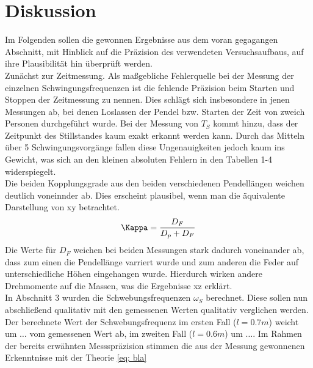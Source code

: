 \section{Diskussion}
Im Folgenden sollen die gewonnen Ergebnisse aus dem voran gegagangen Abschnitt, mit Hinblick auf die Präzision
des verwendeten Versuchsaufbaus, auf ihre Plausibilität hin überprüft werden.\\
Zunächst zur Zeitmessung. Als maßgebliche Fehlerquelle bei der Messung der einzelnen Schwingungsfrequenzen ist die
fehlende Präzision beim Starten und Stoppen der Zeitmessung zu nennen. Dies schlägt sich
insbesondere in jenen Messungen ab, bei denen Loslassen der Pendel bzw. Starten der Zeit
von zweich Personen durchgeführt wurde. Bei der Messung von $T_{S}$ kommt hinzu, dass
der Zeitpunkt des Stillstandes kaum exakt erkannt werden kann. Durch das Mitteln über
5 Schwingungsvorgänge fallen diese Ungenauigkeiten jedoch kaum ins Gewicht, was sich an
den kleinen absoluten Fehlern in den Tabellen 1-4 widerspiegelt. \\
Die beiden Kopplungsgrade aus den beiden verschiedenen Pendellängen weichen deutlich
voneinnder ab. Dies erscheint plausibel, wenn man die äquivalente Darstellung von xy
betrachtet.
\begin{equation*}
  \Kappa = \frac{D_F}{D_p + D_F}
\end{equation*}
Die Werte für $D_F$ weichen bei beiden Messungen stark dadurch voneinander ab, dass
zum einen die Pendellänge varriert wurde und zum anderen die Feder auf unterschiedliche
Höhen eingehangen wurde. Hierdurch wirken andere Drehmomente auf die Massen, was die
Ergebnisse xz erklärt. \\
In Abschnitt 3 wurden die Schwebungsfrequenzen $\omega_{S}$ berechnet. Diese sollen nun
abschließend qualitativ mit den gemessenen Werten qualitativ verglichen werden. Der berechnete
Wert der Schwebungsfrequenz im ersten Fall ($l = 0.7 m$) weicht um $\dots$ vom gemessenen Wert
ab, im zweiten Fall ($l = 0.6 m$) um $\dots$. Im Rahmen der bereits erwähnten Messspräzision
stimmen die aus der Messung gewonnenen Erkenntnisse mit der Theorie \ref{eq: bla}
